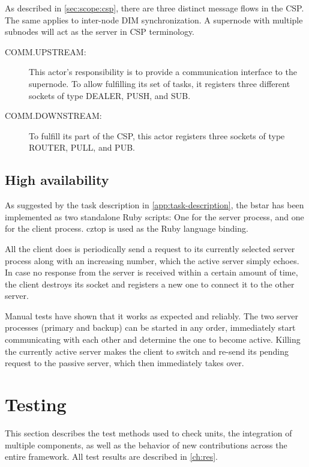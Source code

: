 As described in \autoref{sec:scope:csp}, there are three distinct message flows
in the \gls{CSP}. The same applies to inter-node DIM synchronization. A
supernode with multiple subnodes will act as the server in CSP terminology.

\begin{description}
	\item [COMM.UPSTREAM:]
		This actor's responsibility is to provide a communication
		interface to the supernode. To allow fulfilling its set of
		tasks, it registers three different sockets of type
		DEALER, PUSH, and SUB.

	\item [COMM.DOWNSTREAM:]
		To fulfill its part of the CSP, this actor registers
		three sockets of type ROUTER, PULL, and PUB.
\end{description}


\subsection{High availability}
As suggested by the task description in \autoref{app:task-description}, the
\gls{bstar} has been implemented as two standalone Ruby scripts: One for the
server process, and one for the client process. \gls{cztop} is used as the \zmq
Ruby language binding.

All the client does is periodically send a request to its currently selected
server process along with an increasing number, which the active server simply
echoes. In case no response from the server is received within a certain amount
of time, the client destroys its socket and registers a new one to connect it
to the other server.

Manual tests have shown that it works as expected and reliably. The two server
processes (primary and backup) can be started in any order, immediately start
communicating with each other and determine the one to become active. Killing
the currently active server makes the client to switch and re-send its pending
request to the passive server, which then immediately takes over.


\section{Testing}\label{sec:approach:testing}
This section describes the test methods used to check units, the integration of
multiple components, as well as the behavior of new contributions across the
entire framework.  All test results are described in \autoref{ch:res}.

